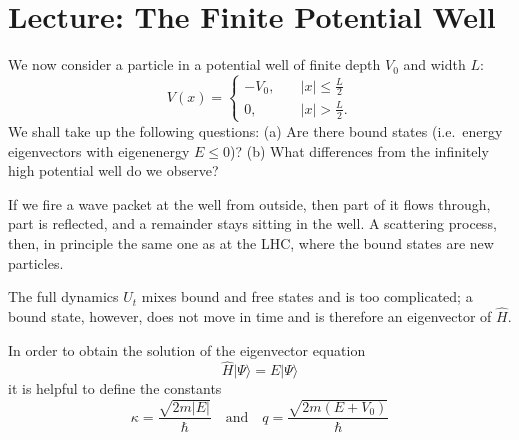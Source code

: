 
\section{Lecture: The Finite Potential Well}
We now consider a particle in a potential well of finite depth $V_0$ and width $L$:
\begin{equation}
	V(x) = \begin{cases}
		-V_0, \quad &|x|\le \frac{L}{2}\\
		0, \quad &|x| > \frac{L}{2}.
	\end{cases}
\end{equation}
We shall take up the following questions: (a) Are there bound states (i.e.\ energy eigenvectors with eigenenergy $E\le 0$)? (b) What differences from the infinitely high potential well do we observe?

\begin{intuition}
	If we fire a wave packet at the well from outside, then part of it flows through, part is reflected, and a remainder stays sitting in the well. A scattering process, then, in principle the same one as at the LHC, where the bound states are new particles.
\end{intuition}

The full dynamics $U_t$ mixes bound and free states and is too complicated; a bound state, however, does not move in time and is therefore an eigenvector of $\widehat{H}$.

In order to obtain the solution of the eigenvector equation  
\begin{equation}
	\widehat{H}|\Psi\rangle = E|\Psi\rangle
\end{equation}
it is helpful to define the constants
\begin{equation}
	\kappa = \frac{\sqrt{2m|E|}}{\hbar}\quad \text{and}\quad q = \frac{\sqrt{2m(E+V_0)}}{\hbar}
\end{equation}


